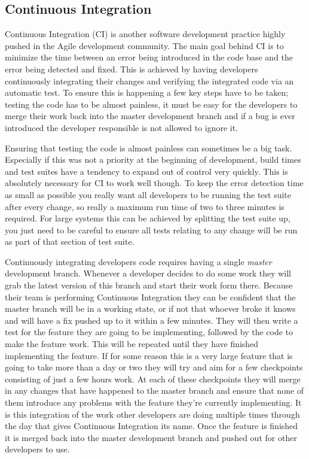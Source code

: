 \subsection{Continuous Integration}

  Continuous Integration (CI) is another software development practice highly
  pushed in the Agile development community.  The main goal behind CI is to
  minimize the time between an error being introduced in the code base and the
  error being detected and fixed.  This is achieved by having developers
  continuously integrating their changes and verifying the integrated code via
  an automatic test.  To ensure this is happening a few key steps have to be
  taken; testing the code has to be almost painless, it must be easy for the
  developers to merge their work back into the master development branch and if
  a bug is ever introduced the developer responsible is not allowed to ignore
  it.

  Ensuring that testing the code is almost painless can sometimes be a big task.
  Especially if this was not a priority at the beginning of development, build
  times and test suites have a tendency to expand out of control very quickly.
  This is absolutely necessary for CI to work well though.  To keep the error
  detection time as small as possible you really want all developers to be
  running the test suite after every change, so really a maximum run time of two
  to three minutes is required.  For large systems this can be achieved by
  splitting the test suite up, you just need to be careful to ensure all tests
  relating to any change will be run as part of that section of test suite.

  Continuously integrating developers code requires having a single
  \emph{master} development branch.  Whenever a developer decides to do some
  work they will grab the latest version of this branch and start their work
  form there.  Because their team is performing Continuous Integration they can
  be confident that the master branch will be in a working state, or if not that
  whoever broke it knows and will have a fix pushed up to it within a few
  minutes.  They will then write a test for the feature they are going to be
  implementing, followed by the code to make the feature work.  This will be
  repeated until they have finished implementing the feature.  If for some
  reason this is a very large feature that is going to take more than a day or
  two they will try and aim for a few checkpoints consisting of just a few hours
  work.  At each of these checkpoints they will merge in any changes that have
  happened to the master branch and ensure that none of them introduce any
  problems with the feature they're currently implementing.  It is this
  integration of the work other developers are doing multiple times through the
  day that gives Continuous Integration its name.  Once the feature is finished
  it is merged back into the master development branch and pushed out for other
  developers to use.


